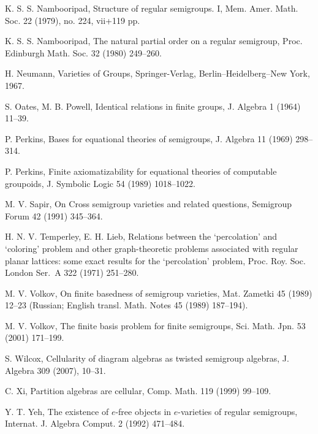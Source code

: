 \documentclass[preprint,1p,times]{elsarticle}
\numberwithin{equation}{section}
\theoremstyle{remark}
\begin{document}
\begin{thebibliography}{99}
K. S. S. Nambooripad, Structure of regular semigroups. I, Mem. Amer. Math. Soc. 22 (1979), no. 224, vii+119 pp.

K. S. S. Nambooripad, The natural partial order on a regular semigroup, Proc. Edinburgh Math. Soc. 32 (1980) 249--260.

H. Neumann, Varieties of Groups, Springer-Verlag, Berlin--Heidelberg--New York, 1967.

S. Oates, M. B. Powell, Identical relations in finite groups, J. Algebra 1 (1964) 11--39.

P. Perkins, Bases for equational theories of semigroups, J. Algebra 11 (1969) 298--314.

P. Perkins, Finite axiomatizability for equational theories of computable groupoids, J. Symbolic Logic 54 (1989)
1018--1022.



M. V. Sapir, On Cross semigroup varieties and related questions, Semigroup Forum 42 (1991) 345--364.

H. N. V. Temperley, E. H. Lieb, Relations between the `percolation' and `coloring' problem and other graph-theoretic
problems associated with regular planar lattices: some exact results for the `percolation' problem, Proc. Roy. Soc.
London Ser.~A  322 (1971) 251--280.

M. V. Volkov, On finite basedness of semigroup varieties, Mat. Zametki 45 (1989) 12--23 (Russian; English transl. Math.
Notes 45 (1989) 187--194).

M. V. Volkov, The finite basis problem for finite semigroups, Sci. Math. Jpn. 53 (2001) 171--199.

S. Wilcox, Cellularity of diagram algebras as twisted semigroup algebras, J. Algebra 309 (2007), 10--31.

C. Xi, Partition algebras are cellular, Comp. Math. 119 (1999) 99--109.

Y. T. Yeh, The existence of $e$-free objects in {$e$-varieties} of regular semigroups, Internat. J. Algebra Comput. 2
(1992) 471--484.

\end{thebibliography}
\end{document}
